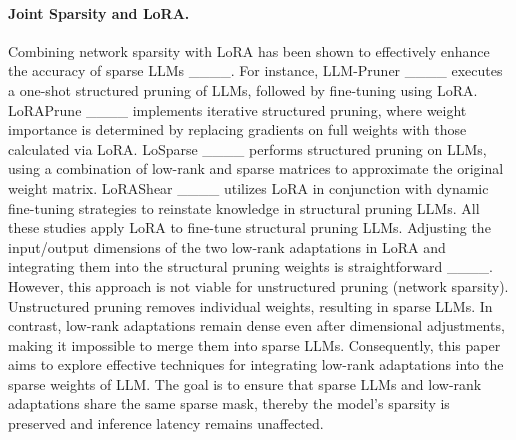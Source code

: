 \paragraph{Joint Sparsity and LoRA.} 
Combining network sparsity with LoRA has been shown to effectively enhance the accuracy of sparse LLMs ____. For instance, LLM-Pruner ____ executes a one-shot structured pruning of LLMs, followed by fine-tuning using LoRA. LoRAPrune ____ implements iterative structured pruning, where weight importance is determined by replacing gradients on full weights with those calculated via LoRA. LoSparse ____ performs structured pruning on LLMs, using a combination of low-rank and sparse matrices to approximate the original weight matrix. LoRAShear ____ utilizes LoRA in conjunction with dynamic fine-tuning strategies to reinstate knowledge in structural pruning LLMs. All these studies apply LoRA to fine-tune structural pruning LLMs. Adjusting the input/output dimensions of the two low-rank adaptations in LoRA and integrating them into the structural pruning weights is straightforward ____. However, this approach is not viable for unstructured pruning (network sparsity). Unstructured pruning removes individual weights, resulting in sparse LLMs. In contrast, low-rank adaptations remain dense even after dimensional adjustments, making it impossible to merge them into sparse LLMs. Consequently, this paper aims to explore effective techniques for integrating low-rank adaptations into the sparse weights of LLM. The goal is to ensure that sparse LLMs and low-rank adaptations share the same sparse mask, thereby the model's sparsity is preserved and inference latency remains unaffected.

\vspace{-0.5cm}